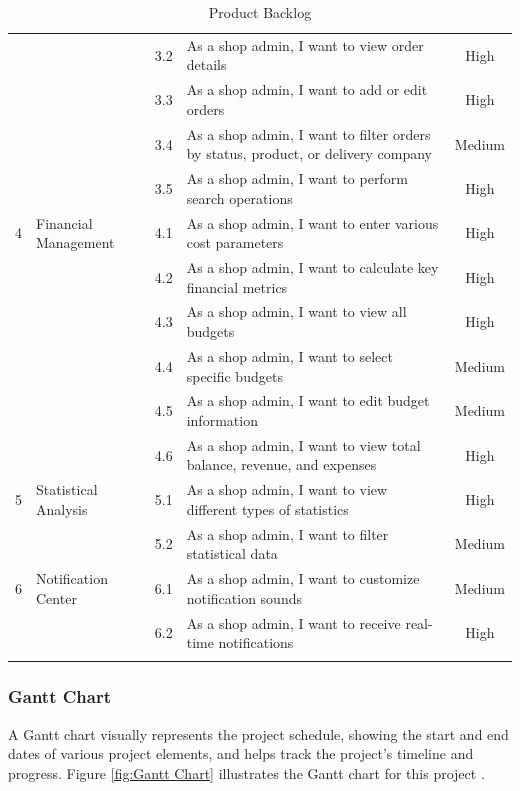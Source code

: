 \begin{longtable}{|c|p{6cm}|c|p{6cm}|c|}
& & 3.2 & As a shop admin, I want to view order details & High \\ \cline{3-5}
& & 3.3 & As a shop admin, I want to add or edit orders & High \\ \cline{3-5}
& & 3.4 & As a shop admin, I want to filter orders by status, product, or delivery company & Medium \\ \cline{3-5}
& & 3.5 & As a shop admin, I want to perform search operations & High \\ \hline
\multirow{1}{*}{4} & \multirow{1}{*}{Financial Management} & 4.1 & As a shop admin, I want to enter various cost parameters & High \\ \cline{3-5}
& & 4.2 & As a shop admin, I want to calculate key financial metrics & High \\ \cline{3-5}
& & 4.3 & As a shop admin, I want to view all budgets & High \\ \cline{3-5}
& & 4.4 & As a shop admin, I want to select specific budgets & Medium \\ \cline{3-5}
& & 4.5 & As a shop admin, I want to edit budget information & Medium \\ \cline{3-5}
& & 4.6 & As a shop admin, I want to view total balance, revenue, and expenses & High \\ \hline
\multirow{1}{*}{5} & \multirow{1}{*}{Statistical Analysis} & 5.1 & As a shop admin, I want to view different types of statistics & High \\ \cline{3-5}
& & 5.2 & As a shop admin, I want to filter statistical data & Medium \\ \hline
\multirow{1}{*}{6} & \multirow{1}{*}{Notification Center} & 6.1 & As a shop admin, I want to customize notification sounds & Medium \\ \cline{3-5}
& & 6.2 & As a shop admin, I want to receive real-time notifications & High \\ \hline

\caption{Product Backlog}
\label{tab:product_backlog}
\end{longtable}

\subsubsection{Gantt Chart}
A Gantt chart visually represents the project schedule, showing the start and end dates of various project elements, and helps track the project's timeline and progress. Figure \ref{fig:Gantt Chart} illustrates the Gantt chart for this project \cite{ganttchart}.

